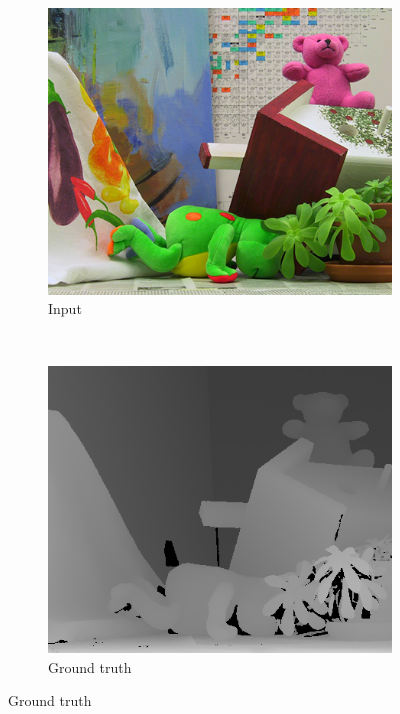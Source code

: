 \begin{figure}
  \setcounter{subfigure}{0}

  \label{fig:grid-of-outputs-teddy}
  \centering


  \begin{subfigure}[b]{0.45\textwidth}
    \centering
    \includegraphics[width=\textwidth]{images/stereo-pairs/teddy_imL.png}
    \caption{Input}
  \end{subfigure}
  ~
  \begin{subfigure}[b]{0.45\textwidth}
    \centering
    \includegraphics[width=\textwidth]{images/stereo-pairs/teddy_groundtruth.png}
    \caption{Ground truth}
  \end{subfigure}


\end{figure}
